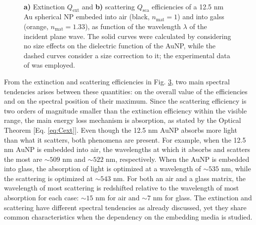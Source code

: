 \begin{figure}[h!]
	\def\svgwidth{1\textwidth} \small
  \vspace*{3.0em}
  \hspace*{-9.em}
    \begin{subfigure}{.46\textwidth}\caption{ }\label{fig:Mieefficiencies:a}\end{subfigure}
    \begin{subfigure}{.49\textwidth}\caption{ }\label{fig:Mieefficiencies:b}\end{subfigure}
  \vspace*{-6.em}\\
  \vspace*{-2em}
  \caption[Extinction and Scattering Efficency of a 12.5 nm Au Spherical NP embeded into Air and Glass]{ \textbf{a)} Extinction $Q_\text{ext}$ and \textbf{b)} scattering $Q_\text{sca}$ efficiencies of a 12.5 nm Au spherical NP embeded into air (black, $n_\text{mat} = 1$)  and into galss (orange, $n_\text{mat} = 1.33$), as function of the wavelength $\lambda$ of the incident plane wave.  The solid curves were calculated by considering no size effects on the dielectric function of the AuNP, while the dashed curves consider a size correction to it; the experimental data of \citeauthor{johnson_optical_1972} \cite{johnson_optical_1972} was employed.}
\label{fig:Mieefficiencies}
\end{figure}

From the extinction and scattering efficiencies in Fig. \ref{fig:Mieefficiencies}, two main spectral tendencies arises between these quantities: on the overall value of the efficiencies and on the spectral position of their maximum. Since the scattering efficiency is two orders of magnitude smaller than the extinction efficiency within the visible range, the main energy loss mechanism is absorption, as stated by the Optical Theorem [Eq. \eqref{eq:Cext}]. Even though the 12.5 nm AuNP absorbs more light than what it scatters, both phenomena are present. For example, when the  12.5 nm AuNP is embedded into air, the wavelengths at which it absorbs and scatters the most are $\sim 509$ nm and $\sim 522$ nm, respectively. When the AuNP is embedded into glass, the absorption of light is optimized at a wavelength of $\sim 535$ nm, while the scattering is optimized at $\sim 543$ nm. For both an air and a glass matrix, the wavelength of most scattering is redshifted relative to the wavelength of most absorption for each case: $\sim 15$ nm for air and $\sim 7$ nm for glass. The extinction and scattering have different spectral tendencies as already discussed, yet they share common characteristics   when the dependency on the embedding media is studied.

